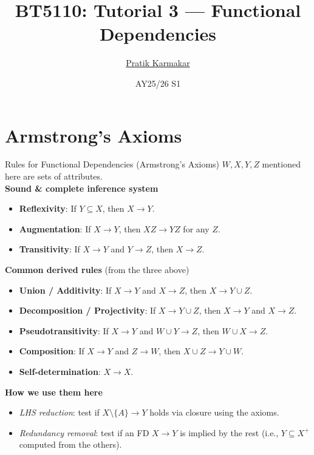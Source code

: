 \documentclass{beamer}
\title{BT5110: Tutorial 3 — Functional Dependencies}
\author{\href{https://pratik2358.github.io/}{Pratik Karmakar}}
\institute{School of Computing,\\ National University of Singapore}
\date{AY25/26 S1}
\begin{document}
\begin{frame}
  \titlepage
\end{frame}


\section{Armstrong's Axioms}
\begin{frame}{Rules for Functional Dependencies (Armstrong's Axioms)}
\scriptsize
$W, X, Y, Z$ mentioned here are \alert{sets} of attributes.\\
\textbf{Sound \& complete inference system}
\begin{itemize}\setlength\itemsep{0.25em}
  \item \textbf{Reflexivity}:\; If $Y\subseteq X$, then $X \to Y$.
  \item \textbf{Augmentation}:\; If $X \to Y$, then $XZ \to YZ$ for any $Z$.
  \item \textbf{Transitivity}:\; If $X \to Y$ and $Y \to Z$, then $X \to Z$.
\end{itemize}

\medskip
\textbf{Common derived rules} (from the three above)
\begin{itemize}\setlength\itemsep{0.25em}
  \item \textbf{Union / Additivity}:\; If $X \to Y$ and $X \to Z$, then $X \to Y\cup Z$.
  \item \textbf{Decomposition / Projectivity}:\; If $X \to Y\cup Z$, then $X \to Y$ and $X \to Z$.
  \item \textbf{Pseudotransitivity}:\; If $X \to Y$ and $W\cup Y \to Z$, then $W\cup X \to Z$.
  \item \textbf{Composition}:\; If $X \to Y$ and $Z \to W$, then $X\cup Z \to Y\cup W$.
  \item \textbf{Self-determination}:\; $X \to X$.
\end{itemize}

\medskip
\textbf{How we use them here}
\begin{itemize}\setlength\itemsep{0.25em}
  \item \emph{LHS reduction}: test if $X\setminus\{A\}\to Y$ holds via closure using the axioms.
  \item \emph{Redundancy removal}: test if an FD $X\to Y$ is implied by the rest (i.e., $Y\subseteq X^+$ computed from the others).
\end{itemize}
\end{frame}
\end{document}
